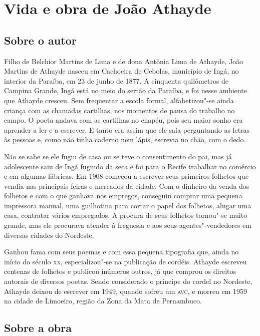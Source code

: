 \chapter{Vida e obra de João Athayde}

\section{Sobre o autor}

\noindent{}Filho de Belchior Martins de Lima e de dona Antônia
Lima de Athayde,
João Martins de Athayde nasceu em Cachoeira de Cebolas, município de
Ingá, no interior da Paraíba, em 23 de junho de 1877. A cinquenta
quilômetros de Campina Grande, Ingá está no meio do sertão da Paraíba,
e foi nesse ambiente que Athayde cresceu. Sem frequentar a escola
formal, alfabetizou"-se ainda criança com as chamadas cartilhas, nos
momentos de pausa do trabalho no campo.
O poeta andava com
as cartilhas no chapéu, pois seu maior sonho era
aprender a ler e a escrever. E tanto era assim que ele saía
perguntando as letras às pessoas e, como não tinha caderno
nem lápis, escrevia no chão, com o dedo.

Não se sabe se ele fugiu de casa ou se teve o
consentimento do pai, mas
já adolescente saiu de Ingá
fugindo da seca e foi para o Recife trabalhar no comércio e em
algumas fábricas. Em 1908 começou a escrever seus primeiros folhetos
que vendia nas principais feiras e mercados da cidade.
Com o dinheiro da venda dos folhetos e com o que
ganhava nos empregos, conseguiu comprar uma pequena
impressora manual, uma guilhotina para cortar o papel
dos folhetos, alugar uma casa, contratar vários empregados.
A procura de seus folhetos tornou"-se muito grande, mas ele
procurava atender à freguesia e aos seus 
agentes"-vendedores em diversas cidades do Nordeste.

Ganhou fama com
seus poemas e com essa pequena tipografia que, ainda no início do século
\textsc{xx}, especializou"-se na publicação de cordéis. Athayde escreveu centenas
de folhetos e publicou inúmeros outros, já que comprou os direitos
autorais de diversos poetas. Sendo considerado o príncipe do cordel no
Nordeste, Athayde deixou de escrever em 1949, quando sofreu um \textsc{avc}, e
morreu em 1959 na cidade de Limoeiro, região da Zona da Mata de
Pernambuco.

\section{Sobre a obra}

